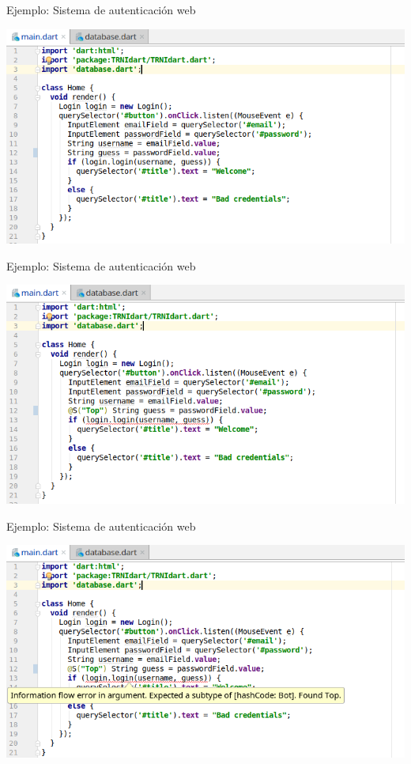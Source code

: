 \documentclass[aspectratio=169,10pt]{beamer}
\begin{document}
\begin{frame}[fragile]{Ejemplo: Sistema de autenticación web}
	\begin{center}
		\includegraphics[width=1.0\textwidth]{images/html1.png}
	\end{center}
\end{frame}

\begin{frame}[fragile]{Ejemplo: Sistema de autenticación web}
	\begin{center}
		\includegraphics[width=1.0\textwidth]{images/html2.png}
	\end{center}
\end{frame}

\begin{frame}[fragile]{Ejemplo: Sistema de autenticación web}
	\begin{center}
		\includegraphics[width=1.0\textwidth]{images/html3.png}
	\end{center}
\end{frame}
\end{document}
